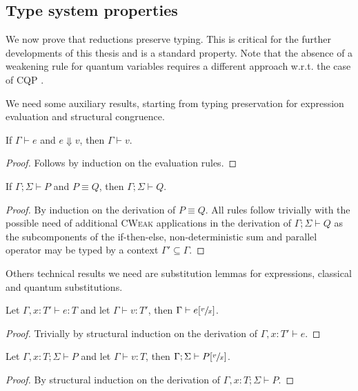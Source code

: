 \subsection{Type system properties}

We now prove that reductions preserve typing. This is critical for the further developments of this thesis and is a standard property. Note that the absence of a weakening rule for quantum variables requires a different approach w.r.t. the case of CQP \cite{gayCommunicatingQuantumProcesses2005}.

We need some auxiliary results, starting from typing preservation for expression evaluation and structural congruence.
 
\begin{theorem}\label{thm:eval_typing}
  If $\Gamma \vdash e$ and $e \Downarrow v$, then $\Gamma \vdash v$.
\end{theorem}
\begin{proof}
  Follows by induction on the evaluation rules.
\end{proof}

\begin{theorem}
  If $\Gamma; \Sigma \vdash P$ and $P \equiv Q$, then $\Gamma; \Sigma \vdash Q$.
\end{theorem}
\begin{proof}
  By induction on the derivation of $P \equiv Q$. All rules follow trivially with the possible need of additional \textsc{CWeak} applications in the derivation
  of $\Gamma; \Sigma \vdash Q$ as the subcomponents of the if-then-else, non-deterministic sum and parallel operator may be typed by a context $\Gamma' \subseteq \Gamma$.
\end{proof}

Others technical results we need are substitution lemmas for expressions, classical and quantum substitutions.

\begin{lemma}
  Let $\Gamma, x : T' \vdash e : T$ and let $\Gamma \vdash v : T'$, then $\Gamma \vdash e[\sfrac{v}{x}]$.
\end{lemma}
\begin{proof}
  Trivially by structural induction on the derivation of $\Gamma, x : T' \vdash e$.
\end{proof}

\begin{theorem}
  Let $\Gamma, x : T; \Sigma \vdash P$ and let $\Gamma \vdash v : T$, then $\Gamma; \Sigma \vdash P[\sfrac{v}{x}]$.
\end{theorem}
\begin{proof}
  By structural induction on the derivation of $\Gamma, x : T; \Sigma \vdash P$.
\end{proof}

